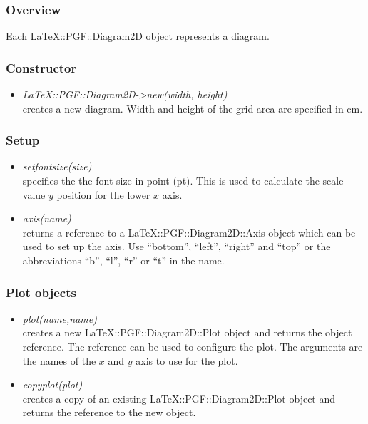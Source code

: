 \documentclass[origlongtable]{scrartcl}
\begin{document}
\subsubsection{Overview}
Each LaTeX::PGF::Diagram2D object represents a diagram.
\subsubsection{Constructor}
\begin{itemize}
\item	\textit{LaTeX::PGF::Diagram2D-\textgreater{}new(width, height)\/}\\
creates a new diagram. Width and height of the grid area are specified
in cm.
\end{itemize}
\subsubsection{Setup}
\begin{itemize}
\item	\textit{set\textunderscore{}font\textunderscore{}size(size)\/}\\
specifies the the font size in point (pt). This is used to calculate
the scale value \(y\) position for the lower \(x\) axis.
\item	\textit{axis(name)\/}\\
returns a reference to a LaTeX::PGF::Diagram2D::Axis object which can
be used to set up the axis. Use ``bottom'', ``left'', ``right'' and ``top''
or the abbreviations ``b'', ``l'', ``r'' or ``t'' in the name.
\end{itemize}
\subsubsection{Plot objects}
\begin{itemize}
\item	\textit{plot(name,name)\/}\\
creates a new LaTeX::PGF::Diagram2D::Plot object and returns the object
reference. The reference can be used to configure the plot.
The arguments are the names of the \(x\) and \(y\) axis to use for the plot.
\item	\textit{copy\textunderscore{}plot(plot)\/}\\
creates a copy of an existing LaTeX::PGF::Diagram2D::Plot object and
returns the reference to the new object.
\end{itemize}
\end{document}
